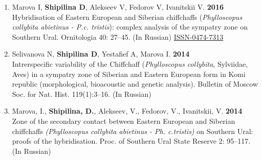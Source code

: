 \documentclass[10pt]{article}
\begin{document}
\begin{cv}
\begin{enumerate}
		\item Marova I, \textbf{Shipilina D}, Alekseev V, Fedorov V, Ivanitskii V. \textbf{2016}\\
		Hybridisation of Eastern European and Siberian chiffchaffs (\textit{Phylloscopus collybita abietinus - P.c. tristis}): complex analysis of the sympatry zone on Southern Ural. Ornitologia 40: 27--45. (In Russian) \href{http://zmmu.msu.ru/ornithology/Vol\%2040/27-47\%20Marova\%20et\%20al.pdf}{ISSN-0474-7313} 

          \item  Selivanova N, \textbf{Shipilina D}, Yestafief A, Marova I. \textbf{2014}\\
            	Intrerspecific variability of the Chiffchaff (\textit{Phylloscopus collybita}, Sylviidae, Aves) in a sympatry zone of Siberian and Eastern European form in Komi republic  (morphological, bioacoustic and genetic analysis). Bulletin of Moscow Soc. for Nat. Hist. 119(1):3--16. (In Russian)
  
	\item Marova, I., \textbf{Shipilina, D.}, Alekseev, V., Fedorov, V., Ivanitskii, V. \textbf{2014}\\
		Zone of the secondary contact between Eastern European and Siberian chiffchaffs \textit{(Phylloscopus collybita abietinus - Ph. c.tristis)} on Southern Ural: proofs of the hybridisation. Proc. of Southern Ural State Reserve 2: 95--117. (In Russian)


\end{enumerate}
\end{cv}
\end{document}
